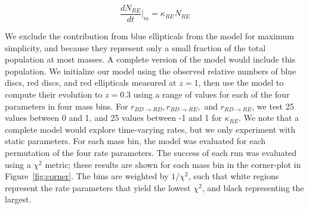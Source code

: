 \documentclass[useAMS,usenatbib]{mn2e}
\begin{document}
\begin{equation}
\frac{dN_{RE}}{dt}\Big\rvert_{m} = \kappa_{RE} N_{RE}  
\label{eqn:RE}
\end{equation}

We exclude the contribution from blue ellipticals from the model for maximum simplicity, and because they represent only a small fraction of the total population at most masses. A complete version of the model would include this population. We initialize our model using the observed relative numbers of blue discs, red discs, and red ellipticals measured at $z=1$, then use the model to compute their evolution to $z=0.3$ using a range of values for each of the four parameters in four mass bins. For $r_{BD \rightarrow RD}, r_{BD \rightarrow RE},$ and $r_{RD \rightarrow RE}$, we test 25 values between 0 and 1, and 25 values between -1 and 1 for $\kappa_{RE}$. We note that a complete model would explore time-varying rates, but we only experiment with static parameters. For each mass bin, the model was evaluated for each permutation of the four rate parameters. The success of each run was evaluated using a $\chi^2$ metric; these results are shown for each mass bin in the corner-plot in Figure~\ref{fig:corner}. The bins are weighted by $1/\chi^2$, such that white regions represent the rate parameters that yield the lowest $\chi^2$, and black representing the largest.
\end{document}
